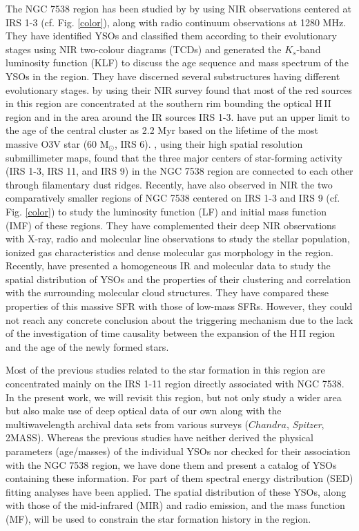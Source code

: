\documentclass[a4paper,fleqn,usenatbib,useAMS]{mnras}
\begin{document}
The NGC 7538 region has been studied by \citet{2004ApJ...616.1042O} by using NIR observations 
centered at IRS 1-3 (cf. Fig. \ref{color}), along with radio continuum observations at 1280 MHz. 
They have identified YSOs and classified them according to their evolutionary stages using NIR two-colour diagrams (TCDs)
and generated the $K_s$-band luminosity function (KLF) to 
discuss the age sequence and  mass spectrum of the YSOs in the region. 
They have discerned several substructures having different evolutionary stages. 
\citet{2004AJ....128.2942B} by using their NIR survey
found that most of the red sources in this region
are concentrated at the southern rim bounding the optical H\,{\sevensize II}  region 
and in the area around the IR sources IRS 1-3. 
\citet{2010A&A...517A...2P} have put an upper limit to the age of the central cluster  as 2.2 Myr
based on the lifetime of the most massive O3V star (60 M$_\odot$, IRS 6).
\citet{2004ApJ...600..269S}, using their  high spatial resolution submillimeter maps, found that
the three major centers of star-forming activity (IRS 1-3, IRS 11, and IRS 9) in the NGC 7538 
region are connected to each other  through filamentary dust ridges. 
Recently, \citet{2014MNRAS.443.3218M} have also observed in NIR 
the two comparatively smaller regions of NGC 7538 
centered on IRS 1-3 and IRS 9 (cf. Fig. \ref{color})
to study the luminosity function (LF) and initial mass function (IMF) of these regions. 
They have complemented their deep NIR observations with X-ray, radio and molecular line observations 
to study the  stellar population,  ionized gas characteristics and dense molecular gas morphology in the region. 
Recently, \citet{2014MNRAS.439.3719C} 
have presented a homogeneous IR and molecular data to study the spatial distribution of YSOs and the 
properties of their clustering and correlation with the surrounding molecular cloud structures. 
They have compared these properties of this massive SFR with those of low-mass SFRs.
However, they could not reach any concrete conclusion about the triggering mechanism 
due to the lack of the investigation of time causality between the expansion of the H\,{\sevensize II} region and the age
of the newly formed stars.


Most of the previous  studies related to the star formation in this region are concentrated mainly on 
the IRS 1-11 region directly associated with NGC 7538. 
In the present work, we will revisit this region, but not only study a wider area  but also
make use of deep optical data of our own along with the  multiwavelength 
archival data sets from various surveys ($Chandra$, {\it Spitzer}, 2MASS).
Whereas the previous studies have neither derived the physical parameters (age/masses) of the 
individual YSOs 
nor checked for their association with the NGC 7538 region,
we have done them 
and present a catalog of YSOs containing these information. For part of them spectral energy distribution (SED) fitting analyses have been applied.
The spatial distribution of these YSOs, along with those of the mid-infrared (MIR) and radio emission,
and the mass function (MF), will be used to constrain the star formation history in the region.
\end{document}
